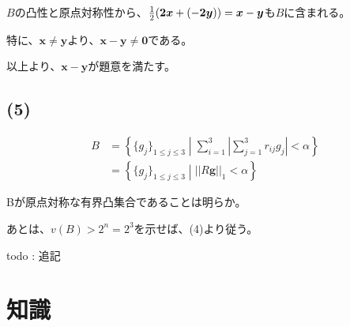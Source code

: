 \documentclass[a4paper, 10pt, dvipdfmx]{jlreq}
\begin{document}
$B$の凸性と原点対称性から、$\frac{1}{2}\qty(\bm{2x}+(-\bm{2y}))=\bm{x}-\bm{y}$も$B$に含まれる。

特に、$\bm{x} \neq \bm{y}$より、$\bm{x}-\bm{y} \neq \bm{0}$である。

以上より、$\bm{x}-\bm{y}$が題意を満たす。

\subsection*{(5)}

\begin{align*}
  B & =\left\{\{g_j\}_{1 \leq j\leq 3} \middle| \sum_{i=1}^{3}\left| \sum_{j=1}^{3}r_{ij}g_j \right| < \alpha \right\} \\
    & =\left\{\{g_j\}_{1 \leq j\leq 3} \middle| ||R\bm{g}||_1 < \alpha \right\}
\end{align*}

Bが原点対称な有界凸集合であることは明らか。

あとは、$v(B)>2^n=2^3$を示せば、(4)より従う。

todo : 追記


\section{知識}

\begin{thebibliography}{9}

\end{thebibliography}
\end{document}
